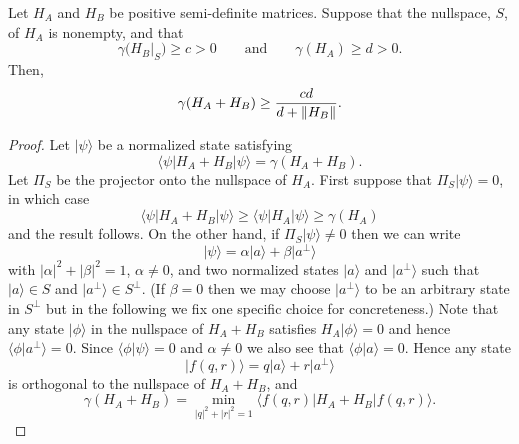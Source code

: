 \documentclass[../thesis-main/thesis-main]{subfiles}
\begin{document}
\begin{lemma}
Let $H_A$ and $H_B$ be positive semi-definite matrices.  Suppose that the nullspace, $S$, of $H_A$ is nonempty, and that 
\begin{equation}
  \gamma\big(H_B|_S\big) \geq c > 0 \qquad \text{and} \qquad \gamma(H_A) \geq d > 0.
\end{equation}
Then,
\begin{equation}
  \gamma(H_A + H_B) \geq \frac{c d}{d + \|{H_B}\|} .
\end{equation}
\end{lemma}
\begin{proof}
Let $|\psi\rangle$ be a normalized state satisfying 
\begin{equation}
\langle\psi|H_{A}+H_{B}|\psi\rangle=\gamma(H_{A}+H_{B}).
\end{equation}
Let $\Pi_{S}$ be the projector onto the nullspace of $H_{A}$. First suppose that $\Pi_{S}|\psi\rangle=0$, in which case 
\begin{equation}
\langle\psi|H_{A}+H_{B}|\psi\rangle\geq\langle\psi|H_{A}|\psi\rangle\geq\gamma(H_{A})
\end{equation}
and the result follows. On the other hand, if $\Pi_{S}|\psi\rangle\neq0$ then we can write 
\begin{equation}
|\psi\rangle=\alpha|a\rangle+\beta|a^{\perp}\rangle
\end{equation}
with $|\alpha|^{2}+|\beta|^{2}=1$, $\alpha\neq0$, and two normalized states $|a\rangle$ and $|a^{\perp}\rangle$ such that $|a\rangle\in S$ and $|a^{\perp}\rangle\in S^{\perp}$. (If $\beta=0$ then we may choose $|a^{\perp}\rangle$ to be an arbitrary state in $S^{\perp}$ but in the following we fix one specific choice for concreteness.) Note that any state $|\phi\rangle$ in the nullspace of $H_{A}+H_{B}$ satisfies $H_{A}|\phi\rangle=0$ and hence $\langle\phi|a^{\perp}\rangle=0$. Since $\langle\phi|\psi\rangle=0$ and $\alpha\neq0$ we also see that $\langle\phi|a\rangle=0$. Hence any state
\begin{equation}
|f(q,r)\rangle=q|a\rangle+r|a^{\perp}\rangle
\end{equation}
is orthogonal to the nullspace of $H_{A}+H_{B}$, and
\begin{equation}
\gamma(H_{A}+H_{B})=\min_{|q|^{2}+|r|^{2}=1}\langle f(q,r)|H_{A}+H_{B}|f(q,r)\rangle.
\end{equation}


\end{proof}
\end{document}

